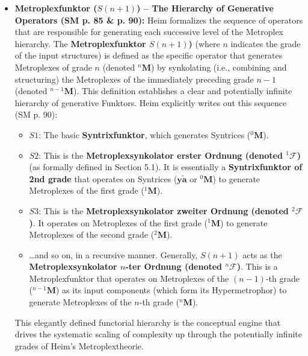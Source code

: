 \documentclass[12pt]{article}
\newcommand{\syntrix}{\bm{y\widetilde{a}}}
\newcommand{\metroplex}[1]{{}^{#1}\mathbf{M}}
\newcommand{\metroplexsynkolator}[1]{{}^{#1}\mathcal{F}}
\newcommand{\metroplexfunktor}{S}
\begin{document}
\begin{itemize}
    \item \textbf{Metroplexfunktor (\( \metroplexfunktor(n+1) \)) – The Hierarchy of Generative Operators (SM p. 85 \& p. 90):}
    Heim formalizes the sequence of operators that are responsible for generating each successive level of the Metroplex hierarchy. The \textbf{Metroplexfunktor \( \metroplexfunktor(n+1) \))} (where \(n\) indicates the grade of the input structures) is defined as the specific operator that generates Metroplexes of grade \( n \) (denoted \( \metroplex{n} \)) by synkolating (i.e., combining and structuring) the Metroplexes of the immediately preceding grade \( n-1 \) (denoted \( \metroplex{n-1} \)). This definition establishes a clear and potentially infinite hierarchy of generative Funktors. Heim explicitly writes out this sequence (SM p. 90):
    \begin{itemize}
        \item \( S 1 \): The basic \textbf{Syntrixfunktor}, which generates Syntrices (\( \metroplex{0} \)). 
        \item \( S 2 \): This is the \textbf{Metroplexsynkolator erster Ordnung (denoted \( \metroplexsynkolator{1} \))} (as formally defined in Section 5.1). It is essentially a \textbf{Syntrixfunktor of 2nd grade} that operates on Syntrices (\( \syntrix \) or \( \metroplex{0} \)) to generate Metroplexes of the first grade (\( \metroplex{1} \)).
        \item \( S 3 \): This is the \textbf{Metroplexsynkolator zweiter Ordnung (denoted \( \metroplexsynkolator{2} \))}. It operates on Metroplexes of the first grade (\( \metroplex{1} \)) to generate Metroplexes of the second grade (\( \metroplex{2} \)).
        \item \dots and so on, in a recursive manner. Generally, \( \metroplexfunktor(n+1) \) acts as the \textbf{Metroplexsynkolator \( n \)-ter Ordnung (denoted \( \metroplexsynkolator{n} \))}. This is a Metroplexfunktor that operates on Metroplexes of the \( (n-1) \)-th grade (\( \metroplex{n-1} \)) as its input components (which form its Hypermetrophor) to generate Metroplexes of the \( n \)-th grade (\( \metroplex{n} \)).
    \end{itemize}
    This elegantly defined functorial hierarchy is the conceptual engine that drives the systematic scaling of complexity up through the potentially infinite grades of Heim's Metroplextheorie.


\end{itemize}
\end{document}
